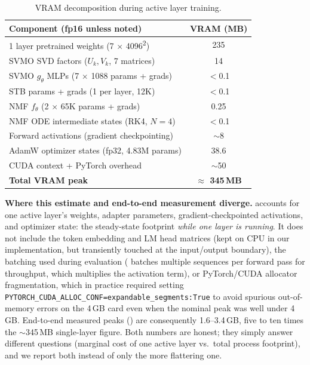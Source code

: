 \documentclass{scpe}
\begin{document}
\begin{table}[t]
\centering
\caption{VRAM decomposition during active layer training.}
\label{tab:vram_detail}
\setlength{\tabcolsep}{3pt}
\begin{tabular}{@{}lc@{}}
\toprule
\textbf{Component (fp16 unless noted)} & \textbf{VRAM (MB)} \\
\midrule
1 layer pretrained weights (7 $\times$ 4096\textsuperscript{2}) & 235 \\
SVMO SVD factors ($U_k, V_k$, 7 matrices) & 14 \\
SVMO $g_\theta$ MLPs (7 $\times$ 1088 params + grads) & $<$0.1 \\
STB params + grads (1 per layer, 12K) & $<$0.1 \\
NMF $f_\theta$ (2 $\times$ 65K params + grads) & 0.25 \\
NMF ODE intermediate states (RK4, $N{=}4$) & $<$0.1 \\
Forward activations (gradient checkpointing) & $\sim$8 \\
AdamW optimizer states (fp32, 4.83M params) & 38.6 \\
CUDA context + PyTorch overhead & $\sim$50 \\
\midrule
\textbf{Total VRAM peak} & \textbf{$\approx$ 345\,MB} \\
\bottomrule
\end{tabular}
\end{table}

\textbf{Where this estimate and end-to-end measurement diverge.}  accounts for one active layer's weights, adapter parameters, gradient-checkpointed activations, and optimizer state: the steady-state footprint \emph{while one layer is running}. It does not include the token embedding and LM head matrices (kept on CPU in our implementation, but transiently touched at the input/output boundary), the batching used during evaluation ( batches multiple sequences per forward pass for throughput, which multiplies the activation term), or PyTorch/CUDA allocator fragmentation, which in practice required setting \texttt{PYTORCH\_CUDA\_ALLOC\_CONF=}\allowbreak\texttt{expandable\_segments:True} to avoid spurious out-of-memory errors on the 4\,GB card even when the nominal peak was well under 4\,GB. End-to-end measured peaks () are consequently 1.6--3.4\,GB, five to ten times the $\sim$345\,MB single-layer figure. Both numbers are honest; they simply answer different questions (marginal cost of one active layer vs.\ total process footprint), and we report both instead of only the more flattering one.
\end{document}
